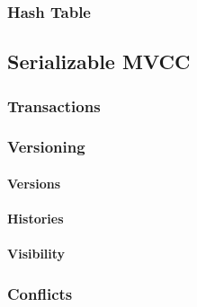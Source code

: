 \subsubsection{Hash Table}



\subsection{Serializable MVCC}
\label{ch:impl-mvcc}

\subsubsection{Transactions}

\subsubsection{Versioning}
\paragraph{Versions}
\paragraph{Histories}
\paragraph{Visibility}

\subsubsection{Conflicts}
